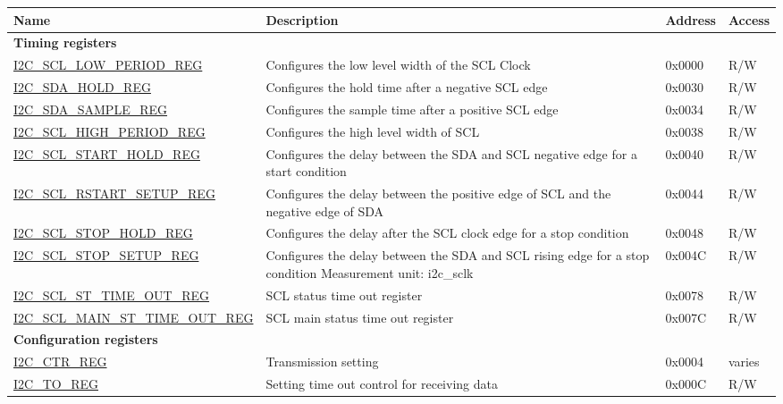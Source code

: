 \begin{longtable}{ | p{6cm} | p{7cm} | p{1.3cm} | p{1cm} | }
\hline\rowcolor{lightgray}
Name & Description &  Address & Access \\ \hline
\endhead
\multicolumn{4}{|l|}{\textbf{Timing registers}} \\ \hline
\hyperref[regdesc:I2CSCLLOWPERIODREG]{I2C\_SCL\_LOW\_PERIOD\_REG} & Configures the low level width of the SCL Clock & 0x0000 & R/W \\ \hline
\hyperref[regdesc:I2CSDAHOLDREG]{I2C\_SDA\_HOLD\_REG} & Configures the hold time after a negative SCL edge & 0x0030 & R/W \\ \hline
\hyperref[regdesc:I2CSDASAMPLEREG]{I2C\_SDA\_SAMPLE\_REG} & Configures the sample time after a positive SCL edge & 0x0034 & R/W \\ \hline
\hyperref[regdesc:I2CSCLHIGHPERIODREG]{I2C\_SCL\_HIGH\_PERIOD\_REG} & Configures the high level width of SCL & 0x0038 & R/W \\ \hline
\hyperref[regdesc:I2CSCLSTARTHOLDREG]{I2C\_SCL\_START\_HOLD\_REG} & Configures the delay between the SDA and SCL negative edge for a start condition & 0x0040 & R/W \\ \hline
\hyperref[regdesc:I2CSCLRSTARTSETUPREG]{I2C\_SCL\_RSTART\_SETUP\_REG} & Configures the delay between the positive edge of SCL and the negative edge of SDA & 0x0044 & R/W \\ \hline
\hyperref[regdesc:I2CSCLSTOPHOLDREG]{I2C\_SCL\_STOP\_HOLD\_REG} & Configures the delay after the SCL clock edge for a stop condition & 0x0048 & R/W \\ \hline
\hyperref[regdesc:I2CSCLSTOPSETUPREG]{I2C\_SCL\_STOP\_SETUP\_REG} & Configures the delay between the SDA and SCL rising edge for a stop condition
Measurement unit: i2c\_sclk & 0x004C & R/W \\ \hline
\hyperref[regdesc:I2CSCLSTTIMEOUTREG]{I2C\_SCL\_ST\_TIME\_OUT\_REG} & SCL status time out register & 0x0078 & R/W \\ \hline
\hyperref[regdesc:I2CSCLMAINSTTIMEOUTREG]{I2C\_SCL\_MAIN\_ST\_TIME\_OUT\_REG} & SCL main status time out register & 0x007C & R/W \\ \hline
\multicolumn{4}{|l|}{\textbf{Configuration registers}} \\ \hline
\hyperref[regdesc:I2CCTRREG]{I2C\_CTR\_REG} & Transmission setting & 0x0004 & varies \\ \hline
\hyperref[regdesc:I2CTOREG]{I2C\_TO\_REG} & Setting time out control for receiving data & 0x000C & R/W \\ \hline

\end{longtable}
